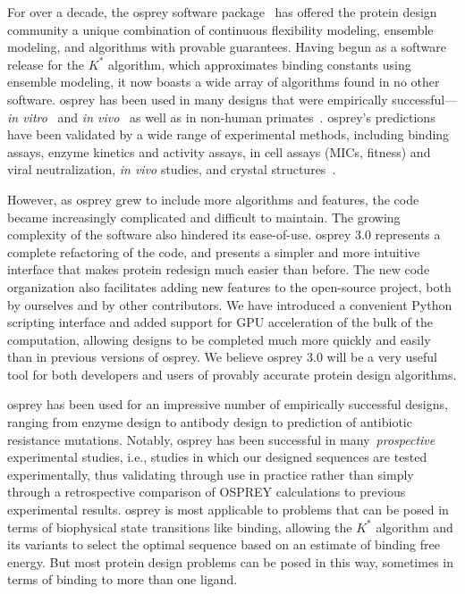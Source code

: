 For over a decade, the {\sc osprey} software package~\cite{OSPREY,minDEE,OSPREY_MIE} has offered the protein design community a unique combination of continuous flexibility modeling, ensemble modeling, and algorithms with provable guarantees.  Having begun as a software release for the $K^*$ algorithm, which approximates binding constants using ensemble modeling, it now boasts a wide array of algorithms found in no other software.  {\sc osprey} has been used in many designs that were empirically successful---\textit{in vitro}~\cite{VRC07_enhance,CFTR,runx1_cbfb,GrsA-LeuA,DHFR-PNAS,GrsA-TyrA,specific_probes} and \textit{in vivo}~\cite{VRC07_enhance,CFTR,runx1_cbfb,DHFR-PNAS} as well as in non-human primates~\cite{VRC07_enhance}.  {\sc osprey}'s predictions have been validated by a wide range of experimental methods, including binding assays, enzyme kinetics and activity assays, in cell assays (MICs, fitness) and viral neutralization, {\em in vivo} studies, and crystal structures~\cite{DHFR-PNAS2, VRC07_enhance}.    

However, as {\sc osprey} grew to include more algorithms and features, the code became increasingly complicated and difficult to maintain.  The growing complexity of the software also hindered its ease-of-use. {\sc osprey} 3.0 represents a complete refactoring of the code, and presents a simpler and more intuitive interface that makes protein redesign much easier than before. The new code organization also facilitates adding new features to the open-source project, both by ourselves and by other contributors.  We have introduced a convenient Python scripting interface and added support for GPU acceleration of the bulk of the computation, allowing designs to be completed much more quickly and easily than in previous versions of {\sc osprey}.  We believe {\sc osprey} 3.0 will be a very useful tool for both developers and users of provably accurate protein design algorithms.  


{\sc osprey} has been used for an impressive number of empirically successful designs, ranging from enzyme design to antibody design to prediction of antibiotic resistance mutations.  Notably, {\sc osprey} has been successful in many~\textit{prospective} experimental studies, i.e., studies in which our designed sequences are tested experimentally, thus validating \osprey through use in practice rather than simply through a retrospective comparison of OSPREY calculations to previous experimental results.  {\sc osprey} is most applicable to problems that can be posed in terms of biophysical state transitions like binding, allowing the $K^*$ algorithm and its variants to select the optimal sequence based on an estimate of binding free energy.  But most protein design problems can be posed in this way, sometimes in terms of binding to more than one ligand.  

